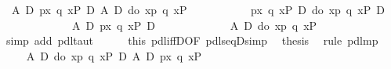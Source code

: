 \begin{isabellebody}
\ {\isachardoublequote}{\isasymturnstile}\ {\isacharparenleft}A\ {\isasymlongrightarrow}\isactrlsub D\ {\isasymlangle}p{\isasymrangle}{\isacharparenleft}{\isasymlambda}x{\isachardot}\ {\isasymlangle}q\ x{\isasymrangle}P{\isacharparenright}{\isacharparenright}\ {\isasymlongrightarrow}\isactrlsub D\ A\ {\isasymlongrightarrow}\isactrlsub D\ {\isasymlangle}do\ {\isacharbraceleft}x{\isasymleftarrow}p{\isacharsemicolon}\ q\ x{\isacharbraceright}{\isasymrangle}P{\isachardoublequote}\isanewline
\ \ \isamarkupfalse%
\ {\isacharminus}\isanewline
\ \ \ \ \isamarkupfalse%
\ {\isachardoublequote}{\isasymturnstile}\ {\isacharparenleft}{\isasymlangle}p{\isasymrangle}{\isacharparenleft}{\isasymlambda}x{\isachardot}\ {\isasymlangle}q\ x{\isasymrangle}P{\isacharparenright}\ {\isasymlongrightarrow}\isactrlsub D\ {\isasymlangle}do\ {\isacharbraceleft}x{\isasymleftarrow}p{\isacharsemicolon}\ q\ x{\isacharbraceright}{\isasymrangle}P{\isacharparenright}\ {\isasymlongrightarrow}\isactrlsub D\isanewline
\ \ \ \ \ \ \ \ \ \ \ \ \ {\isacharparenleft}A\ {\isasymlongrightarrow}\isactrlsub D\ {\isasymlangle}p{\isasymrangle}{\isacharparenleft}{\isasymlambda}x{\isachardot}\ {\isasymlangle}q\ x{\isasymrangle}P{\isacharparenright}{\isacharparenright}\ {\isasymlongrightarrow}\isactrlsub D\isanewline
\ \ \ \ \ \ \ \ \ \ \ \ \ {\isacharparenleft}A\ {\isasymlongrightarrow}\isactrlsub D\ {\isasymlangle}do\ {\isacharbraceleft}x{\isasymleftarrow}p{\isacharsemicolon}\ q\ x{\isacharbraceright}{\isasymrangle}P{\isacharparenright}{\isachardoublequote}\isanewline
\ \ \ \ \ \ \isamarkupfalse%
\ {\isacharparenleft}simp\ add{\isacharcolon}\ pdl{\isacharunderscore}taut{\isacharparenright}\isanewline
\ \ \ \ \isamarkupfalse%
\ this\ pdl{\isacharunderscore}iffD{}{\isacharbrackleft}OF\ pdl{\isacharunderscore}seqD{\isacharunderscore}simp{\isacharbrackright}\ \isamarkupfalse%
\ {\isacharquery}thesis\ \isamarkupfalse%
\ {\isacharparenleft}rule\ pdl{\isacharunderscore}mp{\isacharparenright}\isanewline
\ \ \isamarkupfalse%
\isanewline
\isamarkupfalse%
\isanewline
\ \ \isamarkupfalse%
\ {\isachardoublequote}{\isasymturnstile}\ {\isacharparenleft}A\ {\isasymlongrightarrow}\isactrlsub D\ {\isasymlangle}do\ {\isacharbraceleft}x{\isasymleftarrow}p{\isacharsemicolon}\ q\ x{\isacharbraceright}{\isasymrangle}P{\isacharparenright}\ {\isasymlongrightarrow}\isactrlsub D\ A\ {\isasymlongrightarrow}\isactrlsub D\ {\isasymlangle}p{\isasymrangle}{\isacharparenleft}{\isasymlambda}x{\isachardot}\ {\isasymlangle}q\ x{\isasymrangle}P{\isacharparenright}{\isachardoublequote}\isanewline

\end{isabellebody}
